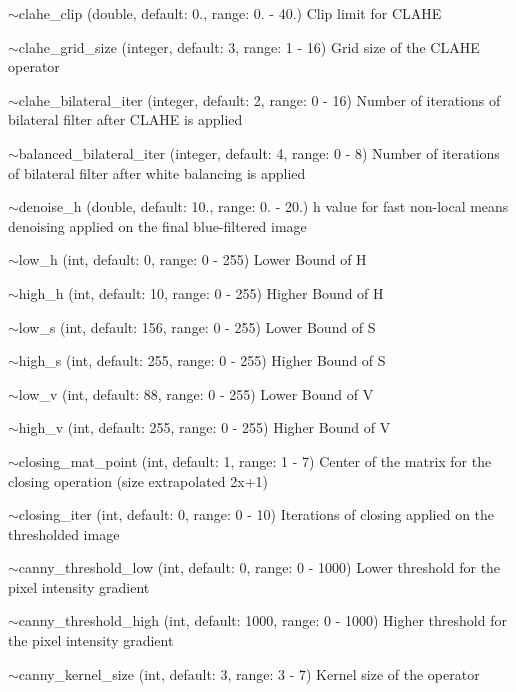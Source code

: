 \begin{DoxyItemize}
\item {\ttfamily $\sim$clahe\+\_\+clip} (double, default\+: 0., range\+: 0. -\/ 40.) Clip limit for C\+L\+A\+HE
\item {\ttfamily $\sim$clahe\+\_\+grid\+\_\+size} (integer, default\+: 3, range\+: 1 -\/ 16) Grid size of the C\+L\+A\+HE operator
\item {\ttfamily $\sim$clahe\+\_\+bilateral\+\_\+iter} (integer, default\+: 2, range\+: 0 -\/ 16) Number of iterations of bilateral filter after C\+L\+A\+HE is applied
\item {\ttfamily $\sim$balanced\+\_\+bilateral\+\_\+iter} (integer, default\+: 4, range\+: 0 -\/ 8) Number of iterations of bilateral filter after white balancing is applied
\item {\ttfamily $\sim$denoise\+\_\+h} (double, default\+: 10., range\+: 0. -\/ 20.) h value for fast non-\/local means denoising applied on the final blue-\/filtered image
\item {\ttfamily $\sim$low\+\_\+h} (int, default\+: 0, range\+: 0 -\/ 255) Lower Bound of H
\item {\ttfamily $\sim$high\+\_\+h} (int, default\+: 10, range\+: 0 -\/ 255) Higher Bound of H
\item {\ttfamily $\sim$low\+\_\+s} (int, default\+: 156, range\+: 0 -\/ 255) Lower Bound of S
\item {\ttfamily $\sim$high\+\_\+s} (int, default\+: 255, range\+: 0 -\/ 255) Higher Bound of S
\item {\ttfamily $\sim$low\+\_\+v} (int, default\+: 88, range\+: 0 -\/ 255) Lower Bound of V
\item {\ttfamily $\sim$high\+\_\+v} (int, default\+: 255, range\+: 0 -\/ 255) Higher Bound of V
\item {\ttfamily $\sim$closing\+\_\+mat\+\_\+point} (int, default\+: 1, range\+: 1 -\/ 7) Center of the matrix for the closing operation (size extrapolated 2x+1)
\item {\ttfamily $\sim$closing\+\_\+iter} (int, default\+: 0, range\+: 0 -\/ 10) Iterations of closing applied on the thresholded image
\item {\ttfamily $\sim$canny\+\_\+threshold\+\_\+low} (int, default\+: 0, range\+: 0 -\/ 1000) Lower threshold for the pixel intensity gradient
\item {\ttfamily $\sim$canny\+\_\+threshold\+\_\+high} (int, default\+: 1000, range\+: 0 -\/ 1000) Higher threshold for the pixel intensity gradient
\item {\ttfamily $\sim$canny\+\_\+kernel\+\_\+size} (int, default\+: 3, range\+: 3 -\/ 7) Kernel size of the operator

\end{DoxyItemize}
